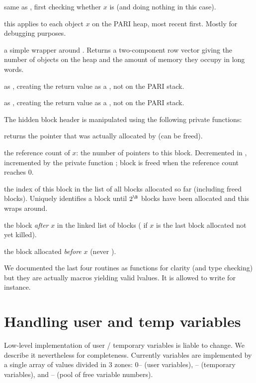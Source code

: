  same as , first
checking whether $x$ is  (and doing nothing in this case).

 this applies
 to each object $x$ on the PARI heap, most recent
first. Mostly for debugging purposes.

 a simple wrapper around . Returns  a
two-component row vector giving the number of objects on the heap and the
amount of memory they occupy in long words.

 as , creating the return
value as a , not on the PARI stack.

 as , creating the return
value as a , not on the PARI stack.

 The hidden block header is manipulated using the
following private functions:

 returns the pointer that was actually allocated
by  (can be freed).

 the reference count of $x$: the number of pointers
to this block. Decremented in , incremented by the private
function ; block is freed when the reference
count reaches $0$.

 the index of this block in the list of all blocks
allocated so far (including freed blocks). Uniquely identifies a block until
$2^\B$ blocks have been allocated and this wraps around.

 the block \emph{after} $x$ in the linked list of
blocks ( if $x$ is the last block allocated not yet killed).

 the block allocated \emph{before} $x$ (never
).

We documented the last four routines as functions for clarity (and type
checking) but they are actually macros yielding valid lvalues. It is allowed
to write  for instance.

\section{Handling user and temp variables}
Low-level implementation of user / temporary variables is liable to change. We
describe it nevertheless for completeness. Currently variables are
implemented by a single array of values divided in 3 zones: 0--
(user variables), -- (temporary variables),
and -- (pool of free variable numbers).


